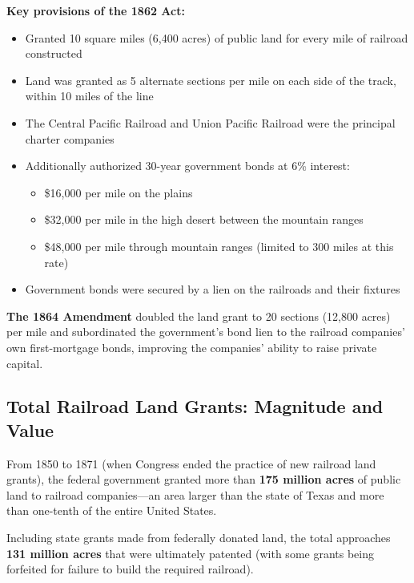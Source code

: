 \documentclass[12pt]{article}
\begin{document}
\textbf{Key provisions of the 1862 Act:}

\begin{itemize}
\item Granted 10 square miles (6,400 acres) of public land for every mile of railroad constructed
\item Land was granted as 5 alternate sections per mile on each side of the track, within 10 miles of the line
\item The Central Pacific Railroad and Union Pacific Railroad were the principal charter companies
\item Additionally authorized 30-year government bonds at 6\% interest:
\begin{itemize}
\item \$16,000 per mile on the plains
\item \$32,000 per mile in the high desert between the mountain ranges
\item \$48,000 per mile through mountain ranges (limited to 300 miles at this rate)
\end{itemize}
\item Government bonds were secured by a lien on the railroads and their fixtures
\end{itemize}

\textbf{The 1864 Amendment} doubled the land grant to 20 sections (12,800 acres) per mile and subordinated the government's bond lien to the railroad companies' own first-mortgage bonds, improving the companies' ability to raise private capital.

\subsection{Total Railroad Land Grants: Magnitude and Value}

From 1850 to 1871 (when Congress ended the practice of new railroad land grants), the federal government granted more than \textbf{175 million acres} of public land to railroad companies---an area larger than the state of Texas and more than one-tenth of the entire United States.

Including state grants made from federally donated land, the total approaches \textbf{131 million acres} that were ultimately patented (with some grants being forfeited for failure to build the required railroad).
\end{document}

